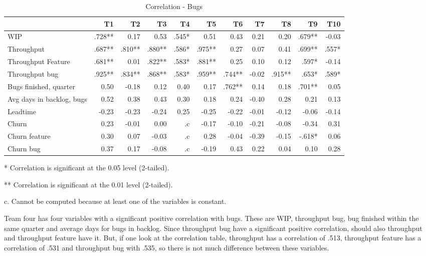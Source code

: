 \documentclass[UKenglish]{ifimaster}  %
\begin{document}
\begin{table}[!htbp]
 \begin{adjustwidth}{-2.5cm}{}
 \centering
 \begin{tabular}{|l|r|r|r|r|r|r|r|r|r|r|}
\hline
 & T1 & T2 & T3 & T4 & T5 & T6 & T7 & T8 & T9 & T10\\ \hline
WIP &.728**& 0.17& 0.53& .545*& 0.51& 0.43& 0.21& 0.20& .679**& -0.03\\ \hline
Throughput &.687**& .810**& .880**& .586*& .975**& 0.27& 0.07& 0.41& .699**& .557*\\ \hline
Throughput Feature &.681**& 0.01& .822**& .583*& .881**& 0.25& 0.10& 0.12& .597*& -0.14\\ \hline
Throughput bug &.925**& .834**& .868**& .583*& .959**& .744**& -0.02& .915**& .653*& .589*\\ \hline
Bugs finished, quarter &0.50& -0.18& 0.12& 0.40& 0.17& .762**& 0.14& 0.18& .701**& 0.05\\ \hline
Avg days in backlog, bugs &0.52& 0.38& 0.43& 0.30& 0.18& 0.24& -0.40& 0.28& 0.21& 0.13\\ \hline
Leadtime &-0.23& -0.23& -0.24& 0.25& -0.25& -0.22& -0.01& -0.12& -0.06& -0.14\\ \hline
Churn &0.23& -0.01& 0.00& .c& -0.17& -0.10& -0.21& -0.08& -0.34& 0.31\\ \hline
Churn feature &0.30& 0.07& -0.03& .c& 0.28& -0.04& -0.39& -0.15& -.618*& 0.06\\ \hline
Churn bug &0.37& 0.17& -0.08& .c
& -0.19& 0.43& 0.22& 0.04& 0.10& 0.28\\ \hline

\end{tabular}
 \caption{Correlation - Bugs}
 \label{corr:bug}
 \centerline {* Correlation is significant at the 0.05 level (2-tailed).}
\centerline{** Correlation is significant at the 0.01 level (2-tailed).}
\centerline{c. Cannot be computed because at least one of the variables is constant.}
\end{adjustwidth}
\end{table}


Team four has four variables with a significant positive correlation with bugs. These are WIP, throughput bug, bug finished within the same quarter and average days for bugs in backlog. Since throughput bug have a significant positive correlation, should also throughput and throughput feature have it. But, if one look at the correlation table, throughput has a correlation of .513, throughput feature has a correlation of .531 and throughput bug with .535, so there is not much difference between these variables.
\end{document}
